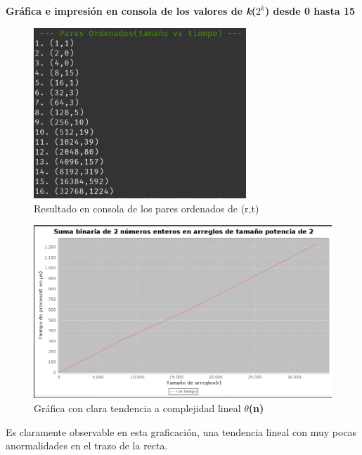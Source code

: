 \documentclass{report}
\begin{document}
\begin{center}
            \hfill \break
            \hfill \break
                
            \textbf{Gráfica e impresión en consola de los valores de \textit{k}($2^k$) desde 0 hasta 15}
                
            \begin{figure}[!h]
            	\centering
            	\includegraphics[width=8cm]{Imagenes/Binarios-R-2.png}
                \caption{Resultado en consola de los pares ordenados de (r,t)}
            \end{figure}
            
            \begin{figure}[!h]
            	\centering
            	\includegraphics[width=16cm]{Imagenes/Binarios-G-2.png}
                \caption{Gráfica con clara tendencia a complejidad lineal \textbf{$\theta$(n)}}
            \end{figure}
            
            Es claramente observable en esta graficación, una tendencia lineal con muy pocas anormalidades en el trazo de la recta.
            
            
            \hfill \break
            \hfill \break
                

\end{center}
\end{document}

